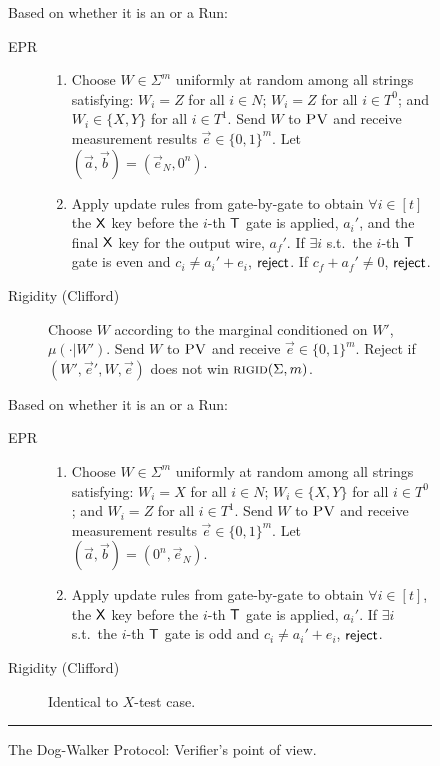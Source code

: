 \documentclass{toc}
\newcommand{\rigid}{\textsc{rigid}}
\newcommand{\pv}{\textsc{PV}}
\begin{document}
\begin{figure}[H]
\begin{description}
\begin{description}
\begin{enumerate}
		\end{enumerate}
	\end{description}
\item[$X$-test] Based on whether it is
an  or a  Run:
\vspace{-0.07cm}   %
\begin{description}
	\item[EPR] 
	\begin{enumerate}
		\item[(i)] Choose $W\in\Sigma^m$ uniformly at random among all strings satisfying: $W_i=Z$ for all $i\in N$; $W_i=Z$ for all $i\in T^0$; and $W_i\in\{X,Y\}$ for all $i\in T^1$. Send $W$ to $\pv$ and receive measurement results $\vec{e}\in\{0,1\}^m$. Let $(\vec{a},\vec{b})=(\vec{e}_N,0^n)$. 
		\item[(ii)] Apply update rules from  gate-by-gate to obtain $\forall i\in [t]$ the $\sf X$ key before the $i$-th $\sf T$ gate is applied, $a_i'$, and the final $\sf X$ key for the output wire, $a_f'$. 
If $\exists i$ s.t.\ the $i$-th $\sf T$ gate is even and $c_i\neq a_i'+e_i$, $\sf reject$. If $c_f+a_f'\neq 0$, $\sf reject$. 
	\end{enumerate}
\vspace{-0.15cm}  %
	\item[Rigidity (Clifford)] Choose ${W}$ according to the marginal conditioned on ${W}'$, $\mu(\cdot|{W}')$. 
	  Send ${W}$ to $\pv$ and receive $\vec{e}\in\{0,1\}^m$. Reject if   $({W}',\vec{e}',{W},\vec{e})$ does not win $\rigid(\Sigma,m)$. 
\end{description}

\item[$Z$-test] Based on whether it is
an  or a  Run:
\vspace{-0.07cm}   %
\begin{description}
	\item[EPR] 
	\begin{enumerate}
		\item[(i)] Choose $W\in\Sigma^m$ uniformly at random among all strings satisfying: $W_i=X$ for all $i\in N$; $W_i\in\{X,Y\}$ for all $i\in T^0$; and $W_i=Z$ for all $i\in T^1$. Send $W$ to $\pv$ and receive measurement results $\vec{e}\in\{0,1\}^m$. Let $(\vec{a},\vec{b})=(0^n,\vec{e}_N)$.
		\item[(ii)] Apply update rules from  gate-by-gate to obtain $\forall i\in [t]$, the $\sf X$ key before the $i$-th $\sf T$ gate is applied, $a_i'$. 
If $\exists i$ s.t.\ the $i$-th $\sf T$ gate is odd and $c_i\neq a_i'+e_i$, $\sf reject$. 
	\end{enumerate}
	\item[Rigidity (Clifford)] Identical to $X$-test case.
\end{description}
\end{description}
\rule[2ex]{\textwidth}{0.5pt}\vspace{-.5cm}
\caption{The Dog-Walker Protocol: Verifier's point of view.}\label{fig:dogwalker-protocol-V}
\end{figure}
\end{document}
